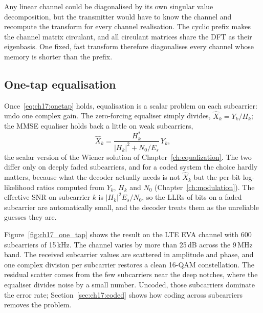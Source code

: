 \begin{keyidea}
Any linear channel could be diagonalised by its own singular value decomposition, but the transmitter
would have to know the channel and recompute the transform for every channel realisation. The cyclic
prefix makes the channel matrix circulant, and all circulant matrices share the DFT as their
eigenbasis. One fixed, fast transform therefore diagonalises every channel whose memory is shorter
than the prefix.
\end{keyidea}


\subsection{One-tap equalisation}

Once~\eqref{eq:ch17:onetap} holds, equalisation is a scalar problem on each subcarrier: undo one
complex gain. The zero-forcing equaliser simply divides, $\hat X_k=Y_k/H_k$; the MMSE equaliser
holds back a little on weak subcarriers,
\begin{equation}
\hat X_k=\frac{H_k^*}{|H_k|^2+N_0/E_s}\,Y_k,
\end{equation}
the scalar version of the Wiener solution of Chapter~\ref{ch:equalization}. The two differ only on deeply
faded subcarriers, and for a coded system the choice hardly matters, because what the decoder
actually needs is not $\hat X_k$ but the per-bit log-likelihood ratios computed from $Y_k$, $H_k$ and
$N_0$ (Chapter~\ref{ch:modulation}). The effective SNR on subcarrier $k$ is
$|H_k|^2E_s/N_0$, so the LLRs of bits on a faded subcarrier are automatically small, and the decoder
treats them as the unreliable guesses they are.

Figure~\ref{fig:ch17_one_tap} shows the result on the LTE EVA channel with 600 subcarriers of 15\,kHz.
The channel varies by more than 25\,dB across the 9\,MHz band. The received subcarrier values are
scattered in amplitude and phase, and one complex division per subcarrier restores a clean 16-QAM
constellation. The residual scatter comes from the few subcarriers near the deep notches, where the
equaliser divides noise by a small number. Uncoded, those subcarriers dominate the error rate;
Section~\ref{sec:ch17:coded} shows how coding across subcarriers removes the problem.

